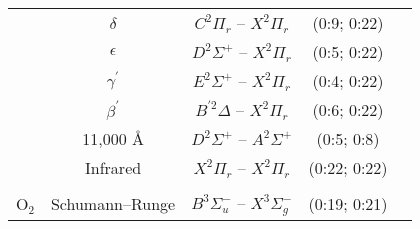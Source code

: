 \begin{center}
\begin{footnotesize}
\begin{supertabular*}{1.0\textwidth}{ccccc}
                                              & $\delta$                                     & $C^2 \Pi_r$ -- $X^2 \Pi_r$                                                 & (0:9; 0:22)                               & \cite{CPR+2002} \\
                                              & $\epsilon$                                 & $D^2 \Sigma^+$ -- $X^2 \Pi_r$                                        & (0:5; 0:22)                               & \cite{CPR+2002} \\
                                              & $\gamma^\prime$                   & $E^2 \Sigma^+$ -- $X^2 \Pi_r$                                        & (0:4; 0:22)                               & \cite{CPR+2002} \\
                                              & $\beta^\prime$                         & $B^{\prime 2} \Delta$ -- $X^2 \Pi_r$                                & (0:6; 0:22)                               & \cite{CPR+2002} \\
                                              & 11,000 \AA                                & $D^2 \Sigma^+$ -- $A^2 \Sigma^+$                                & (0:5; 0:8)                               & \cite{CPR+2002} \\
                                              & Infrared                                      & $X^2 \Pi_r$ -- $X^2 \Pi_r$                                                  & (0:22; 0:22)                               & \cite{CPR+2002} \\
\\
                           O$_2$       & Schumann--Runge                 & $B^3 \Sigma_u^-$ -- $X^3 \Sigma_g^-$                         & (0:19; 0:21)                               & \cite{CPR+2002} \\
 \end{supertabular*}
  \end{footnotesize}
 \end{center}

